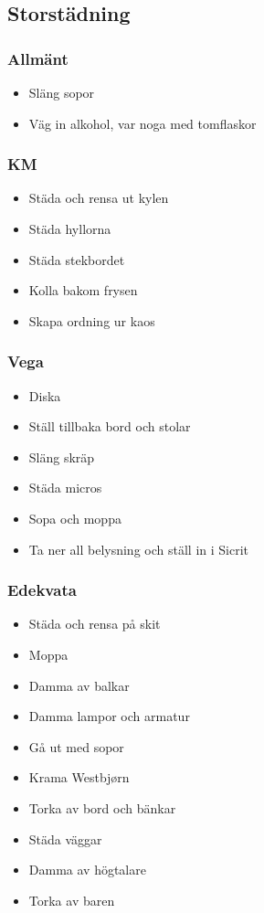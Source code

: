 \documentclass[10pt]{article}
\begin{document}
\subsection{Storstädning}

\subsubsection*{Allmänt}
\begin{itemize}
	\item Släng sopor
	\item Väg in alkohol, var noga med tomflaskor
\end{itemize}

\subsubsection*{KM}
\begin{itemize}
	\item Städa och rensa ut kylen
	\item Städa hyllorna
	\item Städa stekbordet
	\item Kolla bakom frysen
	\item Skapa ordning ur kaos
\end{itemize}

\subsubsection*{Vega}
\begin{itemize}
	\item Diska
	\item Ställ tillbaka bord och stolar
	\item Släng skräp
	\item Städa micros
	\item Sopa och moppa
    \item Ta ner all belysning och ställ in i Sicrit
\end{itemize}

\subsubsection*{Edekvata}
\begin{itemize}
	\item Städa och rensa på skit
	\item Moppa
	\item Damma av balkar
	\item Damma lampor och armatur
	\item Gå ut med sopor
	\item Krama Westbjørn
	\item Torka av bord och bänkar
	\item Städa väggar
	\item Damma av högtalare
    \item Torka av baren
\end{itemize}
\end{document}
